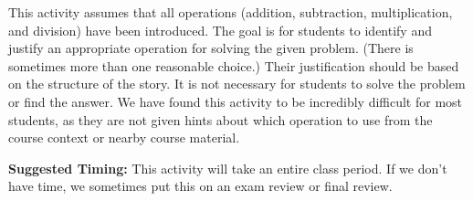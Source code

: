 \documentclass[nooutcomes,noauthor,handout]{ximera}
\begin{document}
\newpage
\begin{instructorNotes}
This activity assumes that all operations (addition, subtraction, multiplication, and division) have been introduced.  The goal is for students to identify and justify an appropriate operation for solving the given problem. (There is sometimes more than one reasonable choice.) Their justification should be based on the structure of the story. It is not necessary for students to solve the problem or find the answer.  We have found this activity to be incredibly difficult for most students, as they are not given hints about which operation to use from the course context or nearby course material.

{\bf Suggested Timing:} This activity will take an entire class period.  If we don't have time, we sometimes put this on an exam review or final review.
\end{instructorNotes}
\end{document}

